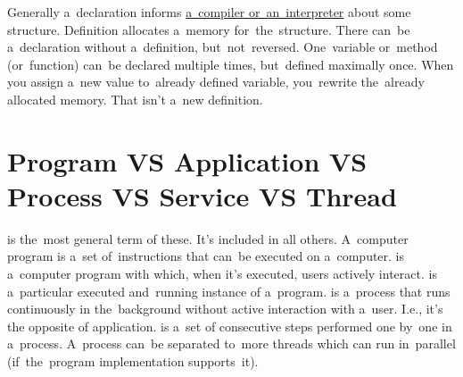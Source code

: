 \noindent Generally a~declaration informs \hyperref[compiledinterpretedlanguages]{a~compiler or~an~interpreter} about some structure.
Definition allocates a~memory for~the~structure.
There can~be a~declaration without a~definition, but~not~reversed.
One~variable or~method (or~function) can~be declared multiple times, but~defined maximally once.
When you assign a~new value to~already defined variable, you~rewrite the~already allocated memory.
That isn't a~new definition.

\section*{\fontsize{17}{17} \selectfont Program VS Application VS Process VS Service VS Thread}
\label{applicationprocessprogramservicethread}
\begin{itemize}
     is the~most general term of these.
            It's included in all others.
            A~computer program is a~set of~instructions that can~be executed on a~computer.
     is a~computer program with which, when it's executed, users actively interact.
     is a~particular executed and~running instance of a~program.
     is a~process that runs continuously in the~background without active interaction with a~user.
            I.e., it's the opposite of application.
     is a~set of consecutive steps performed one by~one in a~process.
            A~process can~be separated to~more threads which can run in~parallel (if~the~program implementation supports~it).
\end{itemize}


